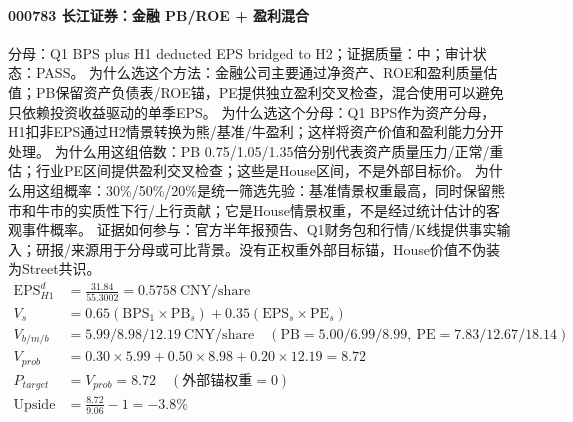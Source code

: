 \paragraph{000783 长江证券：金融 PB/ROE + 盈利混合}
分母：Q1 BPS plus H1 deducted EPS bridged to H2；证据质量：中；审计状态：PASS。
为什么选这个方法：金融公司主要通过净资产、ROE和盈利质量估值；PB保留资产负债表/ROE锚，PE提供独立盈利交叉检查，混合使用可以避免只依赖投资收益驱动的单季EPS。
为什么选这个分母：Q1 BPS作为资产分母，H1扣非EPS通过H2情景转换为熊/基准/牛盈利；这样将资产价值和盈利能力分开处理。
为什么用这组倍数：PB 0.75/1.05/1.35倍分别代表资产质量压力/正常/重估；行业PE区间提供盈利交叉检查；这些是House区间，不是外部目标价。
为什么用这组概率：30\%/50\%/20\%是统一筛选先验：基准情景权重最高，同时保留熊市和牛市的实质性下行/上行贡献；它是House情景权重，不是经过统计估计的客观事件概率。
证据如何参与：官方半年报预告、Q1财务包和行情/K线提供事实输入；研报/来源用于分母或可比背景。没有正权重外部目标锚，House价值不伪装为Street共识。
\begin{align*}
\mathrm{EPS}_{H1}^d &= \frac{31.84}{55.3002} = 0.5758\ \mathrm{CNY/share}\\
V_s &= 0.65\left(\mathrm{BPS}_1\times \mathrm{PB}_s\right)+0.35\left(\mathrm{EPS}_s\times \mathrm{PE}_s\right)\\
V_{b/m/b} &= 5.99/8.98/12.19\ \mathrm{CNY/share}\quad(\mathrm{PB}=5.00/6.99/8.99,\ \mathrm{PE}=7.83/12.67/18.14)\\
V_{prob} &= 0.30\times 5.99+0.50\times 8.98+0.20\times 12.19=8.72\\
P_{target} &= V_{prob}=8.72\quad(\text{外部锚权重}=0)\\
\mathrm{Upside} &= \frac{8.72}{9.06}-1=-3.8\%\\
\end{align*}

